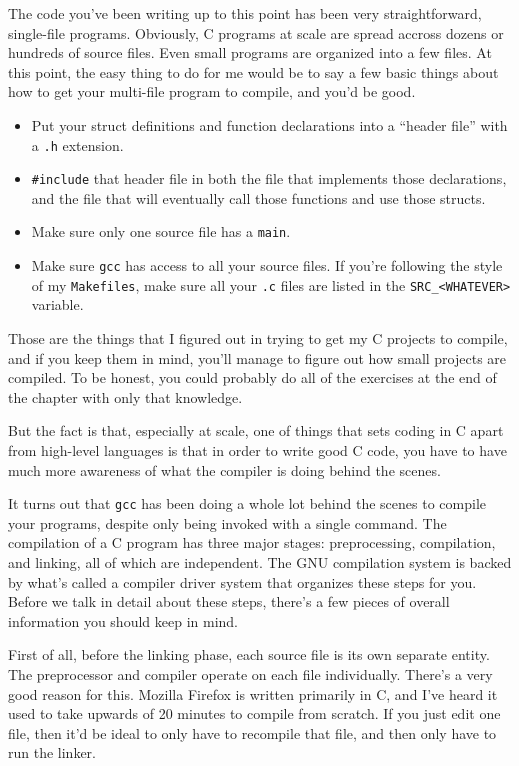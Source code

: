 \documentclass[ebook,11pt,oneside,openany]{memoir}
\newcommand{\cf}[1]{\texttt{#1}}
\begin{document}
The code you've been writing up to this point has been very straightforward, single-file programs. Obviously, C programs at scale are spread accross dozens or hundreds of source files. Even small programs are organized into a few files. At this point, the easy thing to do for me would be to say a few basic things about how to get your multi-file program to compile, and you'd be good.

\begin{itemize}
\item Put your struct definitions and function declarations into a ``header file'' with a \cf{.h} extension.

\item \cf{\#include} that header file in both the file that implements those declarations, and the file that will eventually call those functions and use those structs.

\item Make sure only one source file has a \cf{main}.

\item Make sure \cf{gcc} has access to all your source files. If you're following the style of my \cf{Makefiles}, make sure all your \cf{.c} files are listed in the \cf{SRC\_<WHATEVER>} variable.
\end{itemize}

Those are the things that I figured out in trying to get my C projects to compile, and if you keep them in mind, you'll manage to figure out how small projects are compiled. To be honest, you could probably do all of the exercises at the end of the chapter with only that knowledge.

But the fact is that, especially at scale, one of things that sets coding in C apart from high-level languages is that in order to write good C code, you have to have much more awareness of what the compiler is doing behind the scenes.

It turns out that \cf{gcc} has been doing a whole lot behind the scenes to compile your programs, despite only being invoked with a single command. The compilation of a C program has three major stages: preprocessing, compilation, and linking, all of which are independent. The GNU compilation system is backed by what's called a compiler driver system that organizes these steps for you. Before we talk in detail about these steps, there's a few pieces of overall information you should keep in mind.

First of all, before the linking phase, each source file is its own separate entity. The preprocessor and compiler operate on 
each file individually. There's a very good reason for this. Mozilla Firefox is written primarily in C, and I've heard it used to take upwards of 20 minutes to compile from scratch. If you just edit one file, then it'd be ideal to only have to recompile that file, and then only have to run the linker.
\end{document}
